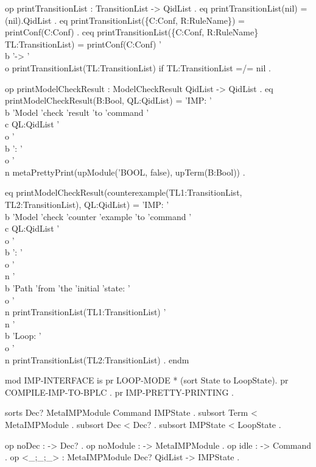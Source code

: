 \documentclass{llncs}%
\begin{document}
    op printTransitionList : TransitionList -> QidList .
    eq printTransitionList(nil) = (nil).QidList .
    eq printTransitionList(\{C:Conf, R:RuleName\}) = printConf(C:Conf) .
    ceq printTransitionList(\{C:Conf, R:RuleName\} TL:TransitionList) =
            printConf(C:Conf) '\\b '-> '\\o printTransitionList(TL:TransitionList)
    if TL:TransitionList =/= nil .

    op printModelCheckResult : ModelCheckResult QidList -> QidList .
    eq printModelCheckResult(B:Bool, QL:QidList) =
           'IMP: '\\b 'Model 'check 'result 'to 'command '\\c QL:QidList '\\o '\\b ': '\\o '\\n
           metaPrettyPrint(upModule('BOOL, false), upTerm(B:Bool)) .

    eq printModelCheckResult(counterexample(TL1:TransitionList, TL2:TransitionList), QL:QidList) =
           'IMP: '\\b 'Model 'check 'counter 'example 'to 'command '\\c QL:QidList '\\o '\\b ': '\\o '\\n
           '\\b 'Path 'from 'the 'initial 'state: '\\o
           '\\n printTransitionList(TL1:TransitionList)
           '\\n '\\b 'Loop: '\\o
           '\\n printTransitionList(TL2:TransitionList) .
endm
\nwendcode{}\nwdocspar

\nwenddocs{}\endmoddef\nwstartdeflinemarkup\nwenddeflinemarkup
mod IMP-INTERFACE is
    pr LOOP-MODE * (sort State to LoopState).
        pr COMPILE-IMP-TO-BPLC .
        pr IMP-PRETTY-PRINTING .

    sorts Dec? MetaIMPModule Command IMPState .
        subsort Term < MetaIMPModule .
        subsort Dec < Dec? .
        subsort IMPState < LoopState .

    op noDec : -> Dec? .
        op noModule : -> MetaIMPModule .
        op idle : -> Command .
        op <_;_;_> : MetaIMPModule Dec? QidList -> IMPState .
\end{document}
